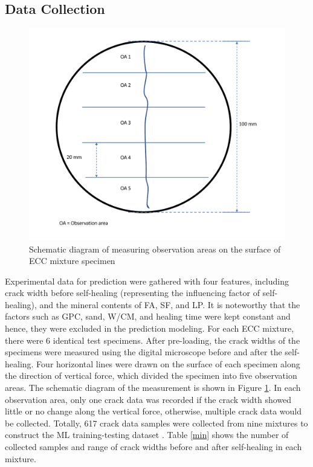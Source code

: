 \documentclass[11pt]{article}
\begin{document}
	\subsection{Data Collection}
	\label{dc}
	
	\begin{figure}[!h]
		\centering
		\includegraphics[width=.75\textwidth]{measurement}
		\caption{Schematic diagram of measuring observation areas on the surface of ECC mixture specimen}
		\label{ma}
	\end{figure}
	
	
	Experimental data for prediction were gathered with four features, including crack width before self-healing (representing the influencing factor of self-healing), and the mineral contents of  FA, SF, and LP. It is noteworthy that the factors such as GPC, sand, W/CM, and healing time were kept  constant and hence, they were excluded in the prediction modeling. For each ECC mixture, there were 6 identical test specimens. After pre-loading, the crack widths of the specimens were measured using the digital microscope before and after the self-healing. Four horizontal lines were drawn on the surface of each specimen along the direction of vertical force, which divided the specimen into five observation areas. The schematic diagram of the measurement is shown in Figure \ref{ma}. In each observation area, only one crack data was recorded if the crack width showed little or no change along the vertical force, otherwise, multiple crack data would be collected. Totally, 617 crack data samples were collected from nine mixtures to construct the ML training-testing dataset \cite{chen2021selfhealing}. Table \ref{min} shows the number of collected samples and range of crack widths before and after self-healing in each mixture. 
	
\end{document}
